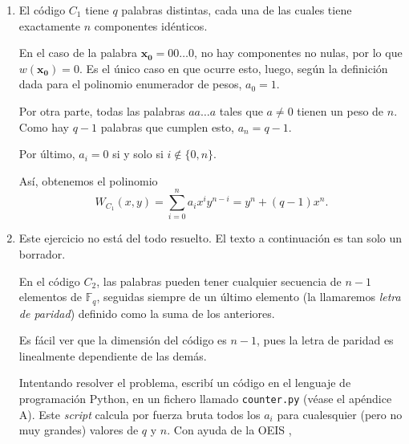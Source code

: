 \begin{enumerate}[label=\alph*)]
	\item El código $C_1$ tiene $q$ palabras distintas, cada una de las cuales tiene exactamente $n$ componentes idénticos.
	
	En el caso de la palabra $\mathbf{x_0} = 00\dots0$, no hay componentes no nulas, por lo que $w(\mathbf{x_0}) = 0$. Es el único caso en que ocurre esto, luego, según la definición dada para el polinomio enumerador de pesos, $a_0 = 1$.
	
	Por otra parte, todas las palabras $aa\dots a$ tales que $a\neq0$ tienen un peso de $n$. Como hay $q-1$ palabras que cumplen esto, $a_n = q-1$.
	
	Por último, $a_i = 0$ si y solo si $i \notin \{0, n\}$.
	
	Así, obtenemos el polinomio
	\[W_{C_1}(x, y) = \sum_{i=0}^n a_i x^i y^{n-i} = y^n + (q-1)x^n.\]
	
	\item \hspace*{1mm}
	
	\begin{draftBox}
		Este ejercicio no está del todo resuelto. El texto a continuación es tan solo un borrador.
	\end{draftBox}
	
	En el código $C_2$, las palabras pueden tener cualquier secuencia de $n-1$ elementos de $\mathbb{F}_q$, seguidas siempre de un último elemento (la llamaremos \textit{letra de paridad}) definido como la suma de los anteriores.
	
	
	
	
	Es fácil ver que la dimensión del código es $n-1$, pues la letra de paridad es linealmente dependiente de las demás.
	
	Intentando resolver el problema, escribí un código en el lenguaje de programación Python, en un fichero llamado \texttt{counter.py} (véase el apéndice A). Este \textit{script} calcula por fuerza bruta todos los $a_i$ para cualesquier (pero no muy grandes) valores de $q$ y $n$. Con ayuda de la OEIS \cite{OEIS:A109499},
	

\end{enumerate}
